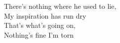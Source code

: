 There's nothing where he used to lie, \\
My inspiration has run dry \\
That's what's going on, \\
Nothing's fine I'm torn \\

